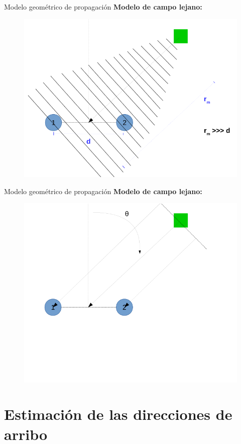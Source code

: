 \documentclass[12pt,aspectratio=169]{beamer}
\begin{document}
	\begin{frame}{Modelo geométrico de propagación}
		\textbf{Modelo de campo lejano:}
		\begin{figure}[h]
			\centering
			\includegraphics[width=0.7\linewidth]{figures/array2.png}
		\end{figure}
	\end{frame}
	
	\begin{frame}{Modelo geométrico de propagación}
		\textbf{Modelo de campo lejano:}
		\begin{figure}[h]
			\centering
			\includegraphics[width=0.7\linewidth]{figures/array3.png}
		\end{figure}
	\end{frame}
	
	\section{Estimación de las direcciones de arribo}
	
\end{document}
